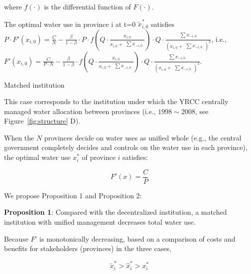 \documentclass{../nsr}
\begin{document}
\begin{case}
    where $f(\cdot)$ is the differential function of $F(\cdot)$.

    The optimal water use in province i at t=0 $\widetilde x_{i,0}^*$ satisfies $P \cdot F'(x_{i,0})=\frac{C}{N}-\frac{\beta}{1-\beta} \cdot P \cdot f(Q \cdot \frac{x_{i,0}}{x_{i,0} + \begin{matrix} \sum x_{-i,0} \end{matrix}}) \cdot Q \cdot \frac{\begin{matrix} \sum x_{-i,0} \end{matrix}}{(x_{i,0} + \begin{matrix} \sum x_{-i,0} \end{matrix})^2}$, i.e., $F'(x_{i,0})=\frac{C}{P \cdot N} - \frac{\beta}{1-\beta} \cdot f(Q \cdot \frac{x_{i,0}}{x_{i,0} + \begin{matrix} \sum x_{-i,0} \end{matrix}}) \cdot Q \cdot \frac{\begin{matrix} \sum x_{-i,0} \end{matrix}}{(x_{i,0} + \begin{matrix} \sum x_{-i,0} \end{matrix})^2}$.

\end{case}

\begin{case} Matched institution

    This case corresponds to the institution under which the YRCC centrally managed water allocation between provinces (i.e., $1998\sim2008$, see Figure~\ref{fig:structure} D).

    When the $N$ provinces decide on water uses as unified whole (e.g., the central government completely decides and controls on the water use in each province), the optimal water use $x_i^*$ of province $i$ satisfies:

    $$F'(x)=\frac{C}{P}$$

\end{case}

We propose Proposition 1 and Proposition 2:

\textbf{Proposition 1}: Compared with the decentralized institution, a matched institution with unified management decreases total water use.

Because $F’$ is monotonically decreasing, based on a comparison of costs and benefits for stakeholders (provinces) in the three cases,

$$\widetilde x_i^*>\hat x_i^*>x_i^*$$
\end{document}
